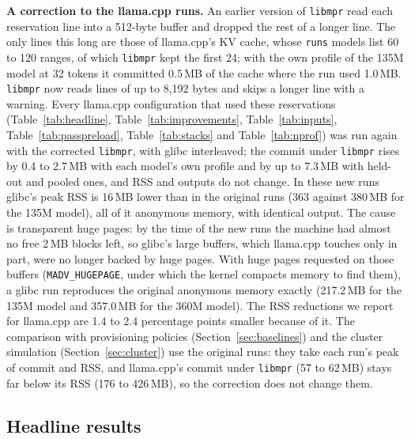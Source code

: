 \documentclass[11pt]{article}
\newcommand{\libmpr}{\texttt{libmpr}}
\newcommand{\pass}{\texttt{MemPrintResize}}
\newcommand{\secref}[1]{Section~\ref{#1}}
\newcommand{\tabref}[1]{Table~\ref{#1}}
\begin{document}
\textbf{A correction to the llama.cpp runs.} An earlier version of \libmpr{} read each reservation line into a
512-byte buffer and dropped the rest of a longer line. The only lines this long are those of llama.cpp's KV cache,
whose \texttt{runs} models list 60 to 120 ranges, of which \libmpr{} kept the first 24; with the own profile of the
135M model at 32 tokens it committed 0.5\,MB of the cache where the run used 1.0\,MB. \libmpr{} now reads lines of up
to 8{,}192 bytes and skips a longer line with a warning. Every llama.cpp configuration that used these reservations
(\tabref{tab:headline}, \tabref{tab:improvements}, \tabref{tab:inputs}, \tabref{tab:passpreload}, \tabref{tab:stacks}
and \tabref{tab:nprof}) was run again with the corrected \libmpr{}, with glibc interleaved; the commit under \libmpr{}
rises by 0.4 to 2.7\,MB with each model's own profile and by up to 7.3\,MB with held-out and pooled ones, and RSS and outputs do not change. In
these new runs glibc's peak RSS is 16\,MB lower than in the original runs (363 against 380\,MB for the 135M model), all
of it anonymous memory, with identical output. The cause is transparent huge pages: by the time of the new runs the
machine had almost no free 2\,MB blocks left, so glibc's large buffers, which llama.cpp touches only in part, were no
longer backed by huge pages. With huge pages requested on those buffers (\texttt{MADV\_HUGEPAGE}, under which the
kernel compacts memory to find them), a glibc run reproduces the original anonymous memory exactly (217.2\,MB for the
135M model and 357.0\,MB for the 360M model). The RSS reductions we report for llama.cpp are 1.4 to 2.4 percentage
points smaller because of it.
The comparison with provisioning policies (\secref{sec:baselines}) and the cluster simulation (\secref{sec:cluster})
use the original runs: they take each run's peak of commit and RSS, and llama.cpp's commit under \libmpr{} (57 to
62\,MB) stays far below its RSS (176 to 426\,MB), so the correction does not change them.

\subsection{Headline results}

\begin{table}[t]
\centering\small

\caption{Peak RSS and peak commit in MB (mean of 3 runs) with the refined system. miniVite's glibc column is the
GCC build; its libmpr columns are the \pass{} build. All other libmpr columns are \libmpr{} preloaded into the GCC
build.}
\label{tab:headline}
\end{table}
\end{document}
